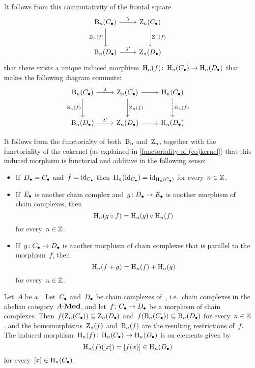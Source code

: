\begin{remark}
\begin{enumerate}
      It follows from this commutativity of the frontal square
      \[
        \begin{tikzcd}[row sep = large]
            \Bl_n(\Ccc)
            \arrow{r}[above]{\lambda}
            \arrow{d}[left]{\Bl_n(f)}
          & \Zl_n(\Ccc)
            \arrow{d}[right]{\Zl_n(f)}
          \\
            \Bl_n(\Dcc)
            \arrow{r}[above]{\lambda'}
          & \Zl_n(\Dcc)
        \end{tikzcd}
      \]
      that there exists a unique induced morphism~$\operatorname{H}_n(f) \colon \operatorname{H}_n(C_\bullet) \to \operatorname{H}_n(D_\bullet)$ that makes the following diagram commute:
      \[
        \begin{tikzcd}[row sep = large]
            \Bl_n(\Ccc)
            \arrow{r}[above]{\lambda}
            \arrow{d}[left]{\Bl_n(f)}
          & \Zl_n(\Ccc)
            \arrow{r}
            \arrow{d}[right]{\Zl_n(f)}
          & \Hl_n(\Ccc)
            \arrow[dashed]{d}[right]{\Hl_n(f)}
          \\
            \Bl_n(\Dcc)
            \arrow{r}[above]{\lambda'}
          & \Zl_n(\Dcc)
            \arrow{r}
          & \Hl_n(\Dcc)
        \end{tikzcd}
      \]
  \end{enumerate}

  It follows from the functorialty of both~$\operatorname{B}_n$ and~$\operatorname{Z}_n$, together with the functoriality of the cokernel (as explained in \cref{functoriality of (co)kernel}) that this induced morphism is functorial and additive in the following sense:
  \begin{itemize}
    \item
      If~$D_\bullet = C_\bullet$ and~$f = \operatorname{id}_{C_\bullet}$ then~$\operatorname{H}_n(\operatorname{id}_{C_\bullet}) = \operatorname{id}_{\operatorname{H}_n(C_\bullet)}$ for every~$n \in \mathbb{Z}$.
    \item
      If~$E_\bullet$ is another chain complex and~$g \colon D_\bullet \to E_\bullet$ is another morphism of chain complexes, then
      \[
          \operatorname{H}_n(g \circ f)
        = \operatorname{H}_n(g) \circ \operatorname{H}_n(f)
      \]
      for every~$n \in \mathbb{Z}$.
    \item
      If~$g \colon C_\bullet \to D_\bullet$ is another morphism of chain complexes that is parallel to the morphism~$f$, then
      \[
          \operatorname{H}_n(f + g)
        = \operatorname{H}_n(f) + \operatorname{H}_n(g)
      \]
      for every~$n \in \mathbb{Z}$.
  \end{itemize}
\end{remark}


\begin{example*}
  Let~$A$ be a~{\kalg}.
  Let~$C_\bullet$ and~$D_\bullet$ be chain complexes of~{}, i.e.\ chain complexes in the abelian category~$\text{$A$-$\mathbf{Mod}$}$, and let~$f \colon C_\bullet \to D_\bullet$ be a morphism of chain complexes.
  Then~$f(\operatorname{Z}_n(C_\bullet)) \subseteq \operatorname{Z}_n(D_\bullet)$ and~$f(\operatorname{B}_n(C_\bullet)) \subseteq \operatorname{B}_n(D_\bullet)$ for every~$n \in \mathbb{Z}$, and the homomorphisms~$\operatorname{Z}_n(f)$ and~$\operatorname{B}_n(f)$ are the resulting restrictions of~$f$.
  The induced morphism~$\operatorname{H}_n(f) \colon \operatorname{H}_n(C_\bullet) \to \operatorname{H}_n(D_\bullet)$ is on elements given by
  \[
        \operatorname{H}_n(f)( [x] )
    =   [f(x)]
    \in \operatorname{H}_n(D_\bullet)
  \]
  for every~$[x] \in \operatorname{H}_n(C_\bullet)$.
\end{example*}


